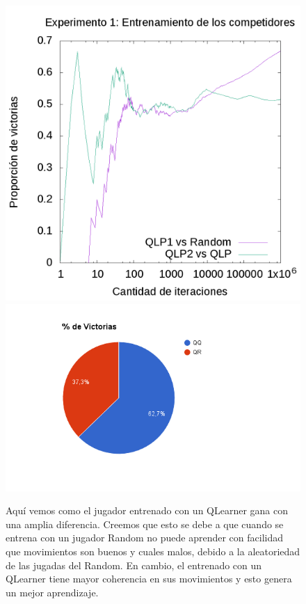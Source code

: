 \documentclass[10pt, a4paper]{article}
\begin{document}
\begin{figure}[H]
  \begin{minipage}[c]{1\textwidth}
  \includegraphics[scale=0.2]{E1train.png}
  \includegraphics[scale=0.45]{QRvsQQ.png}
  \caption{Aquí vemos como el jugador entrenado con un QLearner gana con una amplia diferencia. Creemos que esto se debe a que cuando se entrena con un jugador Random no puede aprender con facilidad que movimientos son buenos y cuales malos, debido a la aleatoriedad de las jugadas del Random. En cambio, el entrenado con un QLearner tiene mayor coherencia en sus movimientos y esto genera un mejor aprendizaje.}
  \end{minipage}
\end{figure}
\end{document}
